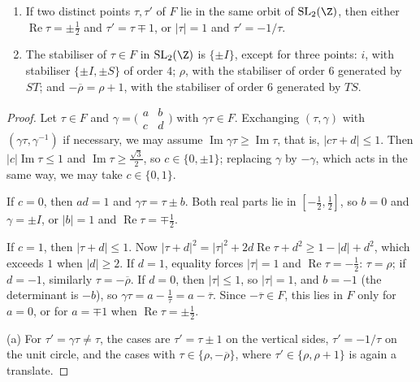 \begin{theorem}\label{thm:funddomain}
\begin{enumerate}[label=(\alph*)]
\item If two distinct points $\tau,\tau'$ of $F$ lie in the same orbit of $\mathrm{SL}_2(\Z)$, then either $\operatorname{Re}\tau=\pm\frac12$ and $\tau'=\tau\mp1$, or
$|\tau|=1$ and $\tau'=-1/\tau$.
\item The stabiliser of $\tau\in F$ in $\mathrm{SL}_2(\Z)$ is $\{\pm I\}$, except for three points: $i$, with stabiliser $\{\pm I,\pm S\}$ of order $4$; $\rho$, with
the stabiliser of order $6$ generated by $ST$; and $-\overline\rho=\rho+1$, with the stabiliser of order $6$ generated by $TS$.
\end{enumerate}
\end{theorem}
\begin{proof}
Let $\tau\in F$ and $\gamma=\bigl(\begin{smallmatrix}a&b\\c&d\end{smallmatrix}\bigr)$ with $\gamma\tau\in F$. Exchanging $(\tau,\gamma)$ with $(\gamma\tau,\gamma^{-1})$ if
necessary, we may assume $\operatorname{Im}\gamma\tau\ge\operatorname{Im}\tau$, that is, $|c\tau+d|\le1$. Then $|c|\operatorname{Im}\tau\le1$ and
$\operatorname{Im}\tau\ge\frac{\sqrt3}2$, so $c\in\{0,\pm1\}$; replacing $\gamma$ by $-\gamma$, which acts in the same way, we may take $c\in\{0,1\}$.

If $c=0$, then $ad=1$ and $\gamma\tau=\tau\pm b$. Both real parts lie in $[-\frac12,\frac12]$, so $b=0$ and $\gamma=\pm I$, or $|b|=1$ and
$\operatorname{Re}\tau=\mp\frac12$.

If $c=1$, then $|\tau+d|\le1$. Now $|\tau+d|^2=|\tau|^2+2d\operatorname{Re}\tau+d^2\ge1-|d|+d^2$, which exceeds $1$ when $|d|\ge2$. If $d=1$, equality forces
$|\tau|=1$ and $\operatorname{Re}\tau=-\frac12$: $\tau=\rho$; if $d=-1$, similarly $\tau=-\overline\rho$. If $d=0$, then $|\tau|\le1$, so $|\tau|=1$, and $b=-1$ (the
determinant is $-b$), so $\gamma\tau=a-\frac1\tau=a-\overline\tau$. Since $-\overline\tau\in F$, this lies in $F$ only for $a=0$, or for $a=\mp1$ when $\operatorname{Re}\tau=\pm\frac12$.

(a) For $\tau'=\gamma\tau\ne\tau$, the cases are $\tau'=\tau\pm1$ on the vertical sides, $\tau'=-1/\tau$ on the unit circle, and the cases with
$\tau\in\{\rho,-\overline\rho\}$, where $\tau'\in\{\rho,\rho+1\}$ is again a translate.


\end{proof}
